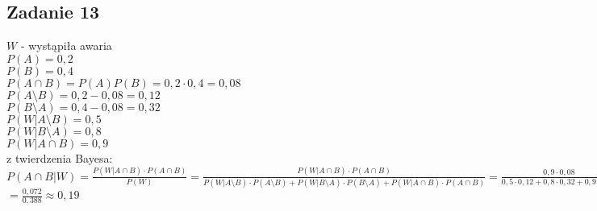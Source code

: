 \subsection{Zadanie 13}

$W$ - wystąpiła awaria\\
$P(A) = 0,2$\\
$P(B) = 0,4$ \\
$P(A \cap B) = P(A)P(B) = 0,2 \cdot 0,4 = 0,08$\\
$P(A \setminus B) = 0,2 - 0,08 = 0,12$\\
$P(B \setminus A) = 0,4 - 0,08 = 0,32$\\
$P(W | A \setminus B) = 0,5$\\
$P(W | B \setminus A) = 0,8$\\
$P(W | A \cap B) = 0,9$\\
z twierdzenia Bayesa:\\
$P(A \cap B | W) = \frac{P(W | A \cap B) \cdot P(A \cap B)}{P(W)}= \frac{P(W | A \cap B) \cdot P(A \cap B)}{P(W | A \setminus B) \cdot P(A \setminus B) + P(W | B \setminus A) \cdot P(B \setminus A)+ P(W | A \cap B) \cdot P(A \cap B)} = \frac{0,9 \cdot 0,08}{0,5 \cdot 0,12 + 0,8 \cdot 0,32+ 0,9 \cdot 0,08}=$\\
$=\frac{0,072}{0,388} \approx 0,19$

